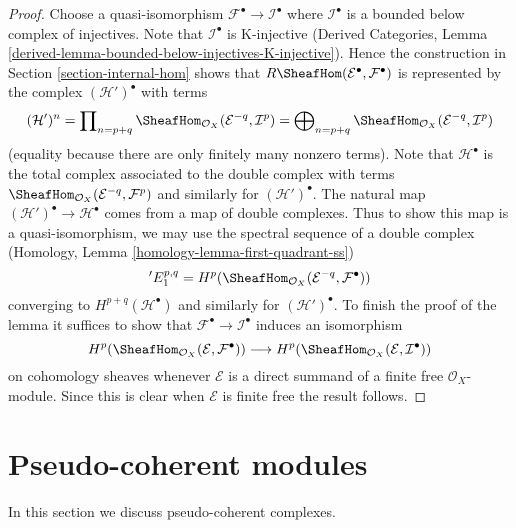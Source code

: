 \begin{proof}
Choose a quasi-isomorphism $\mathcal{F}^\bullet \to \mathcal{I}^\bullet$
where $\mathcal{I}^\bullet$ is a bounded below complex of injectives.
Note that $\mathcal{I}^\bullet$ is K-injective
(Derived Categories, Lemma
\ref{derived-lemma-bounded-below-injectives-K-injective}).
Hence the construction in Section \ref{section-internal-hom}
shows that
$R\SheafHom(\mathcal{E}^\bullet, \mathcal{F}^\bullet)$ is 
represented by the complex $(\mathcal{H}')^\bullet$ with terms
$$
(\mathcal{H}')^n =
\prod\nolimits_{n = p + q}
\SheafHom_{\mathcal{O}_X}(\mathcal{E}^{-q}, \mathcal{I}^p) =
\bigoplus\nolimits_{n = p + q}
\SheafHom_{\mathcal{O}_X}(\mathcal{E}^{-q}, \mathcal{I}^p)
$$
(equality because there are only finitely many nonzero terms).
Note that $\mathcal{H}^\bullet$ is the total complex associated to
the double complex with terms
$\SheafHom_{\mathcal{O}_X}(\mathcal{E}^{-q}, \mathcal{F}^p)$
and similarly for $(\mathcal{H}')^\bullet$.
The natural map $(\mathcal{H}')^\bullet \to \mathcal{H}^\bullet$
comes from a map of double complexes.
Thus to show this map is a quasi-isomorphism, we may use the spectral
sequence of a double complex
(Homology, Lemma \ref{homology-lemma-first-quadrant-ss})
$$
{}'E_1^{p, q} =
H^p(\SheafHom_{\mathcal{O}_X}(\mathcal{E}^{-q}, \mathcal{F}^\bullet))
$$
converging to $H^{p + q}(\mathcal{H}^\bullet)$ and similarly for
$(\mathcal{H}')^\bullet$. To finish the proof of the lemma it
suffices to show that $\mathcal{F}^\bullet \to \mathcal{I}^\bullet$
induces an isomorphism
$$
H^p(\SheafHom_{\mathcal{O}_X}(\mathcal{E}, \mathcal{F}^\bullet))
\longrightarrow
H^p(\SheafHom_{\mathcal{O}_X}(\mathcal{E}, \mathcal{I}^\bullet))
$$
on cohomology sheaves whenever $\mathcal{E}$ is a direct summand of a
finite free $\mathcal{O}_X$-module. Since this is clear when $\mathcal{E}$
is finite free the result follows.
\end{proof}





\section{Pseudo-coherent modules}
\label{section-pseudo-coherent}

\noindent
In this section we discuss pseudo-coherent complexes.

